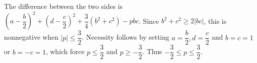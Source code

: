 The difference between the two sides is $(a-\dfrac{b}{2})^2+(d-\dfrac{c}{2})^2+\dfrac{3}{4}(b^2+c^2)-pbc$. Since $b^2+c^2\ge2|bc|$, this is nonnegative when $|p|\le\dfrac{3}{2}$. Necessity follows by setting $a = \dfrac{b}{2} , d = \dfrac{c}{2}$ and $b=c=1$ or $b=-c=1$, which force $p\le\dfrac{3}{2}$ and $p\ge-\dfrac{3}{2}$. Thus $\boxed{-\dfrac{3}{2}\le p\le\dfrac{3}{2}}$.
